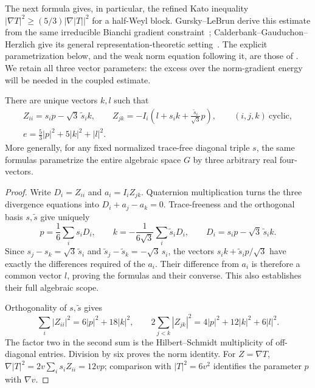 The next formula gives, in particular, the refined Kato inequality
$|\nabla T|^2\ge(5/3)|\nabla|T||^2$ for a half-Weyl block.
Gursky--LeBrun derive this estimate from the same irreducible Bianchi
gradient constraint~\cite[Lemma~4, Equations~(10)--(12)]{GurskyLeBrun1999};
Calderbank--Gauduchon--Herzlich give its general representation-theoretic
setting~\cite[Equation~(7.1)]{CalderbankGauduchonHerzlich2000}.
The explicit parametrization below, and the weak norm equation following
it, are those of \cite[Lemma~2.5 and Proposition~2.6]{OpenAI2026P}.
We retain all three vector parameters: the excess over the norm-gradient
energy will be needed in the coupled estimate.

\begin{lemma}
\label{lem:gradient-parametrization}
There are unique vectors $k,l$ such that
\begin{equation}
 \begin{gathered}
 Z_{ii}=s_i p-\sqrt3\,\widetilde s_i k,\qquad
 Z_{jk}=-I_i\left(l+s_i k+\frac{\widetilde s_i}{\sqrt3}p\right),
 \qquad (i,j,k)\ \text{cyclic},\\
 e=\frac53|p|^2+5|k|^2+|l|^2.
 \end{gathered}
 \tag{2}\label{eq:2}
\end{equation}
More generally, for any fixed normalized trace-free diagonal triple
$s$, the same formulas parametrize the entire algebraic space $G$
by three arbitrary real four-vectors.
\end{lemma}

\begin{proof}
Write $D_i=Z_{ii}$ and $a_i=I_iZ_{jk}$. Quaternion multiplication
turns the three divergence equations into
$D_i+a_j-a_k=0$. Trace-freeness and the orthogonal basis
$s,\widetilde s$ give uniquely
\[
 p=\frac16\sum_i s_iD_i,\qquad
 k=-\frac1{6\sqrt3}\sum_i\widetilde s_iD_i,\qquad
 D_i=s_ip-\sqrt3\,\widetilde s_i k.
\]
Since
$s_j-s_k=\sqrt3\,\widetilde s_i$ and
$\widetilde s_j-\widetilde s_k=-\sqrt3\,s_i$,
the vectors $s_i k+\widetilde s_i p/\sqrt3$ have exactly the
differences required of the $a_i$. Their difference from $a_i$ is
therefore a common vector $l$, proving the formulas and their
converse. This also establishes their full algebraic scope.

Orthogonality of $s,\widetilde s$ gives
\[
 \sum_i|Z_{ii}|^2=6|p|^2+18|k|^2,\qquad
 2\sum_{j<k}|Z_{jk}|^2=4|p|^2+12|k|^2+6|l|^2.
\]
The factor two in the second sum is the Hilbert--Schmidt multiplicity
of off-diagonal entries. Division by six proves the norm identity.
For $Z=\nabla T$,
$\nabla|T|^2=2v\sum_i s_iZ_{ii}=12vp$; comparison with
$|T|^2=6v^2$ identifies the parameter $p$ with $\nabla v$.
\end{proof}

